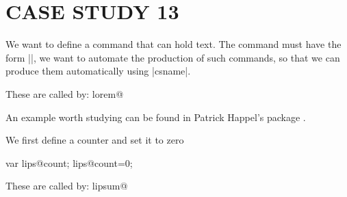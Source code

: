 \chapter*{CASE STUDY 13}
We want to define a command that can hold text. The command must have the form |\lorem@i|, we want to automate the production of such commands, so that we can produce them automatically using |csname|.

\topline
\begin{teXXX}

These are called by:
 \csname lorem@\endcsname%
\end{teXXX}
\bottomline

An example worth studying can be found in Patrick Happel's package .

We first define a counter and set it to zero


\begin{teX}
\setcounter{lips@count}{0}

var lips@count;
      lips@count=0;
\end{teX}



\begin{teXXX}
\newcommand\lips@default{1-7}

\newcommand\setlipsumdefault[1]{%
  \renewcommand{\lips@default}{#1}}

\newcommand\lips@dolipsum{%
  \ifnum\value{lips@count}<\lips@max\relax%
    \addtocounter{lips@count}{1}%
    \csname lipsum@\roman{lips@count}\endcsname%
    \lips@dolipsum%
  \fi  
}

\newcommand\lipsum[1][\lips@default]{%
  \expandafter\lips@minmax\expandafter{#1}%
  \setcounter{lips@count}{\lips@min}%
  \addtocounter{lips@count}{-1}%
  \lips@dolipsum%
}

\def\lips@get#1-#2;{\def\lips@min{#1}\def\lips@max{#2}}
\def\lips@stripmax#1-{\edef\lips@max{#1}}
\def\lips@minmax#1{%
  \lips@get#1-\relax;%
  \edef\lips@tmpa{\lips@max}%
  \edef\lips@relax{\relax}%
  \ifx\lips@tmpa\lips@relax\edef\lips@max{\lips@min}%
  \else\expandafter\lips@stripmax\lips@max\fi%
}

\newcommand\lipsum@i{Lorem ipsum dolor sit amet, consectetuer
  adipiscing elit. Ut purus elit, vestibulum ut, placerat ac,
  adipiscing vitae, felis.. \par}

These are called by:
 \csname lipsum@\endcsname%

\end{teXXX}



